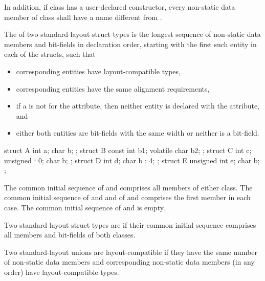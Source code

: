 \pnum
In addition, if class  has a user-declared
constructor, every non-static data member of class
 shall have a name different from .

\pnum
The  of two standard-layout struct
types is the longest sequence of non-static data
members and bit-fields in declaration order, starting with the first
such entity in each of the structs, such that
\begin{itemize}
\item
corresponding entities
have layout-compatible types,
\item
corresponding entities have the same alignment requirements,
\item
if a 
is not  for the  attribute,
then neither entity is declared with
the  attribute, and
\item
either both entities are bit-fields with the same width
or neither is a bit-field.
\end{itemize}
\begin{example}
\begin{codeblock}
struct A { int a; char b; };
struct B { const int b1; volatile char b2; };
struct C { int c; unsigned : 0; char b; };
struct D { int d; char b : 4; };
struct E { unsigned int e; char b; };
\end{codeblock}
The common initial sequence of  and  comprises all members
of either class. The common initial sequence of  and  and
of  and  comprises the first member in each case.
The common initial sequence of  and  is empty.
\end{example}

\pnum
Two standard-layout struct types are
 if
their common initial sequence comprises all members and bit-fields of
both classes.

\pnum
Two standard-layout unions are layout-compatible if they
have the same number of non-static data members and corresponding
non-static data members (in any order) have layout-compatible
types.

